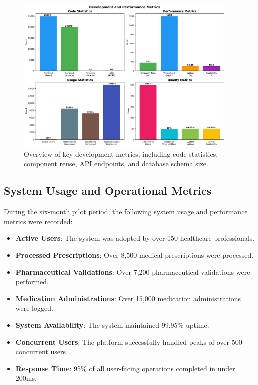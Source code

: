 \begin{figure}[htbp]
    \centering
    \includegraphics[width=0.95\textwidth]{images/generated/development_metrics.png}
    \caption{Overview of key development metrics, including code statistics, component reuse, API endpoints, and database schema size.}
    \label{fig:development-metrics}
\end{figure}

\subsection{System Usage and Operational Metrics}

During the six-month pilot period, the following system usage and performance metrics were recorded:
\begin{itemize}
    \item \textbf{Active Users}: The system was adopted by over 150 healthcare professionals.
    \item \textbf{Processed Prescriptions}: Over 8,500 medical prescriptions were processed.
    \item \textbf{Pharmaceutical Validations}: Over 7,200 pharmaceutical validations were performed.
    \item \textbf{Medication Administrations}: Over 15,000 medication administrations were logged.
    \item \textbf{System Availability}: The system maintained 99.95\% uptime.
    \item \textbf{Concurrent Users}: The platform successfully handled peaks of over 500 concurrent users \cite{nkenyereye2016}.
    \item \textbf{Response Time}: 95\% of all user-facing operations completed in under 200ms.
\end{itemize}

